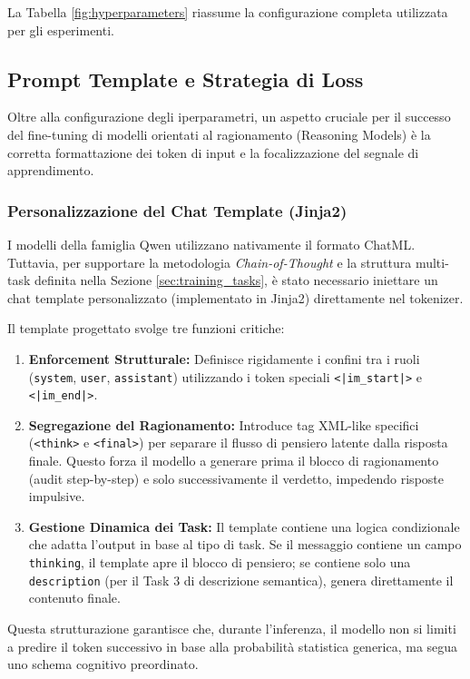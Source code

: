 La Tabella \ref{fig:hyperparameters} riassume la configurazione completa utilizzata per gli esperimenti.

\subsection{Prompt Template e Strategia di Loss}
\label{sec:chat_template_loss}

Oltre alla configurazione degli iperparametri, un aspetto cruciale per il successo del fine-tuning di modelli orientati al ragionamento (Reasoning Models) è la corretta formattazione dei token di input e la focalizzazione del segnale di apprendimento.

\subsubsection{Personalizzazione del Chat Template (Jinja2)}
I modelli della famiglia Qwen utilizzano nativamente il formato ChatML. Tuttavia, per supportare la metodologia \textit{Chain-of-Thought} e la struttura multi-task definita nella Sezione \ref{sec:training_tasks}, è stato necessario iniettare un chat template personalizzato (implementato in Jinja2) direttamente nel tokenizer.

Il template progettato svolge tre funzioni critiche:
\begin{enumerate}
    \item \textbf{Enforcement Strutturale:} Definisce rigidamente i confini tra i ruoli (\texttt{system}, \texttt{user}, \texttt{assistant}) utilizzando i token speciali \texttt{<|im\_start|>} e \texttt{<|im\_end|>}.
    \item \textbf{Segregazione del Ragionamento:} Introduce tag XML-like specifici (\texttt{<think>} e \texttt{<final>}) per separare il flusso di pensiero latente dalla risposta finale. Questo forza il modello a generare prima il blocco di ragionamento (audit step-by-step) e solo successivamente il verdetto, impedendo risposte impulsive.
    \item \textbf{Gestione Dinamica dei Task:} Il template contiene una logica condizionale che adatta l'output in base al tipo di task. Se il messaggio contiene un campo \texttt{thinking}, il template apre il blocco di pensiero; se contiene solo una \texttt{description} (per il Task 3 di descrizione semantica), genera direttamente il contenuto finale.
\end{enumerate}

Questa strutturazione garantisce che, durante l'inferenza, il modello non si limiti a predire il token successivo in base alla probabilità statistica generica, ma segua uno schema cognitivo preordinato.

